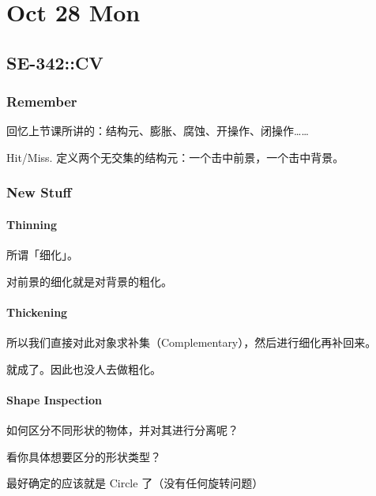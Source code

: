 \documentclass[
]{article}
\date{}
\begin{document}
\hypertarget{header-n0}{%
\section{Oct 28 Mon}\label{header-n0}}

\hypertarget{header-n2}{%
\subsection{SE-342::CV}\label{header-n2}}

\hypertarget{header-n3}{%
\subsubsection{Remember}\label{header-n3}}

回忆上节课所讲的：结构元、膨胀、腐蚀、开操作、闭操作\ldots\ldots{}

Hit/Miss. 定义两个无交集的结构元：一个击中前景，一个击中背景。

\hypertarget{header-n6}{%
\subsubsection{New Stuff}\label{header-n6}}

\hypertarget{header-n7}{%
\paragraph{Thinning}\label{header-n7}}

所谓「细化」。

对前景的细化就是对背景的粗化。

\hypertarget{header-n10}{%
\paragraph{Thickening}\label{header-n10}}

所以我们直接对此对象求补集（Complementary），然后进行细化再补回来。

就成了。因此也没人去做粗化。

\hypertarget{header-n13}{%
\paragraph{Shape Inspection}\label{header-n13}}

如何区分不同形状的物体，并对其进行分离呢？

看你具体想要区分的形状类型？

最好确定的应该就是 Circle 了（没有任何旋转问题）
\end{document}
